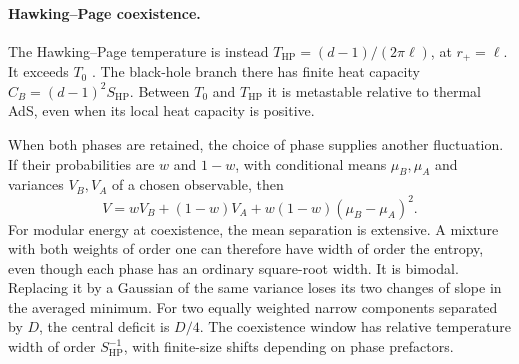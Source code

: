 \documentclass[11pt,letterpaper]{article}
\theoremstyle{plain}
\theoremstyle{definition}
\theoremstyle{remark}
\begin{document}
\paragraph{Hawking--Page coexistence.}
The Hawking--Page temperature is instead
$T_{\mathrm{HP}}=(d-1)/(2\pi\ell)$, at $r_+=\ell$.
It exceeds $T_0$ \citep{hawkingpage1983}. The black-hole branch there has
finite heat capacity $C_B=(d-1)^2S_{\mathrm{HP}}$. Between $T_0$ and
$T_{\mathrm{HP}}$ it is metastable relative to thermal AdS, even when its
local heat capacity is positive.

When both phases are retained, the choice of phase supplies another
fluctuation. If their probabilities are $w$ and $1-w$, with conditional means
$\mu_B,\mu_A$ and variances $V_B,V_A$ of a chosen observable, then
\begin{equation}
 V=wV_B+(1-w)V_A+w(1-w)(\mu_B-\mu_A)^2.
 \label{eq09:coexistence_variance}
\end{equation}
For modular energy at coexistence, the mean separation is extensive.
A mixture with both weights of order one can therefore have width of order
the entropy, even though each phase has an ordinary square-root width.
It is bimodal. Replacing it by a Gaussian of the same variance loses its
two changes of slope in the averaged minimum. For two equally weighted
narrow components separated by $D$, the central deficit is $D/4$.
The coexistence window has relative temperature width of order
$S_{\mathrm{HP}}^{-1}$, with finite-size shifts depending on phase prefactors.
\end{document}

